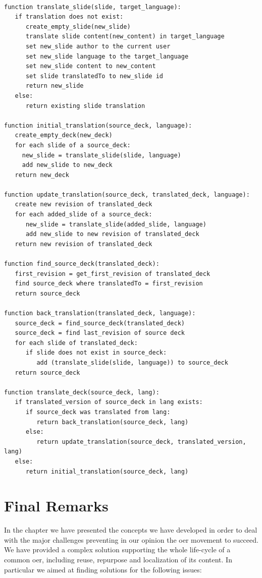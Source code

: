 \documentclass[PhD, Submit, ngerman,UKenglish,table]{scrbook}
\begin{document}
\begin{framed}
\begin{lstlisting}[basicstyle=\small]

function translate_slide(slide, target_language):
   if translation does not exist:
      create_empty_slide(new_slide)
      translate slide content(new_content) in target_language  
      set new_slide author to the current user
      set new_slide language to the target_language
      set new_slide content to new_content
      set slide translatedTo to new_slide id
      return new_slide
   else: 
      return existing slide translation
   
function initial_translation(source_deck, language):
   create_empty_deck(new_deck)
   for each slide of a source_deck:
     new_slide = translate_slide(slide, language)
     add new_slide to new_deck
   return new_deck
   
function update_translation(source_deck, translated_deck, language):
   create new revision of translated_deck
   for each added_slide of a source_deck:     
      new_slide = translate_slide(added_slide, language)
      add new_slide to new revision of translated_deck
   return new revision of translated_deck
   
function find_source_deck(translated_deck):
   first_revision = get_first_revision of translated_deck 
   find source_deck where translatedTo = first_revision
   return source_deck
   
function back_translation(translated_deck, language):
   source_deck = find_source_deck(translated_deck)
   source_deck = find last_revision of source deck
   for each slide of translated_deck:
      if slide does not exist in source_deck:
         add (translate_slide(slide, language)) to source_deck
   return source_deck
   
function translate_deck(source_deck, lang):
   if translated_version of source_deck in lang exists:
      if source_deck was translated from lang:
         return back_translation(source_deck, lang)
      else:
         return update_translation(source_deck, translated_version, lang)
   else:
      return initial_translation(source_deck, lang)
\end{lstlisting}
\end{framed}

\section{Final Remarks}
In the chapter we have presented the concepts we have developed in order to deal with the major challenges preventing in our opinion the \gls{oer} movement to succeed.
We have provided a complex solution supporting the whole life-cycle of a common \gls{oer}, including reuse, repurpose and localization of its content.
In particular we aimed at finding solutions for the following issues:
\end{document}
